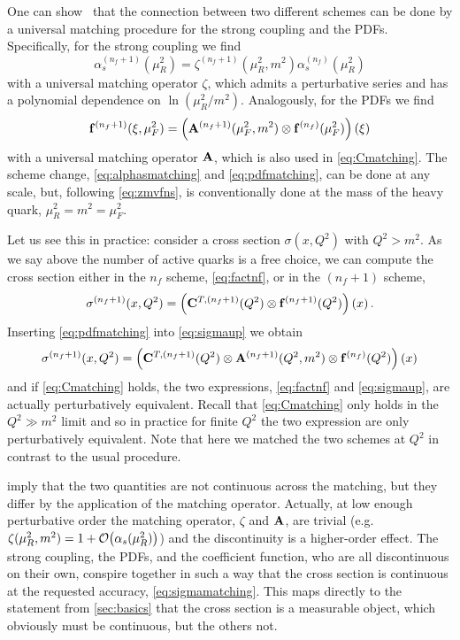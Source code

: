 One can show~\cite{Barontini:2024xgu} that the connection between two different schemes can be done by a universal matching procedure for the strong coupling and the PDFs.
Specifically, for the strong coupling we find
\begin{equation}
    \alpha_s^{(n_f+1)}(\mu_R^2) = \zeta^{(n_f+1)}(\mu_R^2, m^2)\alpha_s^{(n_f)}(\mu_R^2) \label{eq:alphasmatching}
\end{equation}
with a universal matching operator $\zeta$, which admits a perturbative series and has a polynomial dependence on $\ln(\mu_R^2/m^2)$.
Analogously, for the PDFs we find
\begin{equation}
    \vb f^{(n_f+1)}(\xi, \mu_F^2) = \left(\vb A^{(n_f+1)}(\mu_F^2, m^2) \otimes \vb f^{(n_f)}(\mu_F^2)\right)(\xi) \label{eq:pdfmatching}
\end{equation}
with a universal matching operator $\vb A$, which is also used in \cref{eq:Cmatching}.
The scheme change, \cref{eq:alphasmatching} and \cref{eq:pdfmatching}, can be done at any scale, but, following \cref{eq:zmvfns}, is conventionally done at the mass of the heavy quark, $\mu_R^2 = m^2 = \mu_F^2$.

Let us see this in practice: consider a cross section $\sigma(x,Q^2)$ with $Q^2 > m^2$.
As we say above the number of active quarks is a free choice, we can compute the cross section either in the $n_f$ scheme, \cref{eq:factnf}, or in the $(n_f+1)$ scheme,
\begin{equation}
    \sigma^{(n_f+1)}(x,Q^2) = \left(\vb C^{T,(n_f+1)}(Q^2) \otimes \vb f^{(n_f+1)}(Q^2)\right)(x)\,. \label{eq:sigmaup}
\end{equation}
Inserting \cref{eq:pdfmatching} into \cref{eq:sigmaup} we obtain
\begin{equation}
    \sigma^{(n_f+1)}(x,Q^2) = \left(\vb C^{T,(n_f+1)}(Q^2) \otimes \vb A^{(n_f+1)}(Q^2,m^2) \otimes \vb f^{(n_f)}(Q^2)\right)(x) \label{eq:sigmaupmatched}
\end{equation}
and if \cref{eq:Cmatching} holds, the two expressions, \cref{eq:factnf} and \cref{eq:sigmaup}, are actually perturbatively equivalent.
Recall that \cref{eq:Cmatching} only holds in the $Q^2 \gg m^2$ limit and so in practice for finite $Q^2$ the two expression are only perturbatively equivalent.
Note that here we matched the two schemes at $Q^2$ in contrast to the usual procedure.

 imply that the two quantities are not continuous across the matching, but they differ by the application of the matching operator.
Actually, at low enough perturbative order the matching operator, $\zeta$ and $\vb A$, are trivial (e.g.\ $\zeta(\mu_R^2,m^2) = 1+\order{\alpha_s(\mu_R^2)}$) and the discontinuity is a higher-order effect.
The strong coupling, the PDFs, and the coefficient function, who are all discontinuous on their own, conspire together in such a way that the cross section is continuous at the requested accuracy, \cref{eq:sigmamatching}.
This maps directly to the statement from \cref{sec:basics} that the cross section is a measurable object, which obviously must be continuous, but the others not.

